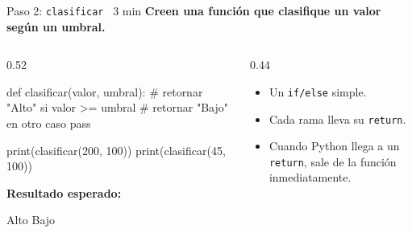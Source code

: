 \documentclass[aspectratio=169, 11pt]{beamer}
\begin{document}
\begin{frame}[fragile,shrink=28]{Paso 2: \texttt{clasificar} \hfill
    {\normalsize\color{arcaRed}\faClock\ 3 min}}
  \vspace{-6pt}
  {\footnotesize\color{arcaDark}\bfseries
    Creen una función que clasifique un valor según un umbral.}

  \vspace{4pt}
  \begin{columns}[T]
    \begin{column}{0.52\textwidth}
      \begin{pyblock}
def clasificar(valor, umbral):
    # retornar "Alto" si valor >= umbral
    # retornar "Bajo" en otro caso
    pass

print(clasificar(200, 100))
print(clasificar(45, 100))
      \end{pyblock}

      \vspace{4pt}
      {\scriptsize\color{textMuted}\bfseries Resultado esperado:}
      \begin{outputblock}
Alto
Bajo
      \end{outputblock}
    \end{column}

    \begin{column}{0.44\textwidth}
      \vspace{2pt}
      {\scriptsize\color{textMuted}
      \begin{itemize}\setlength{\itemsep}{4pt}
        \item[{\color{arcaRed}\scriptsize\faArrowRight}]
          Un \texttt{if/else} simple.
        \item[{\color{arcaRed}\scriptsize\faArrowRight}]
          Cada rama lleva su \texttt{return}.
        \item[{\color{arcaRed}\scriptsize\faLightbulb}]
          Cuando Python llega a un \texttt{return},
          sale de la función inmediatamente.
      \end{itemize}
      }
    \end{column}
  \end{columns}
\end{frame}
\end{document}
